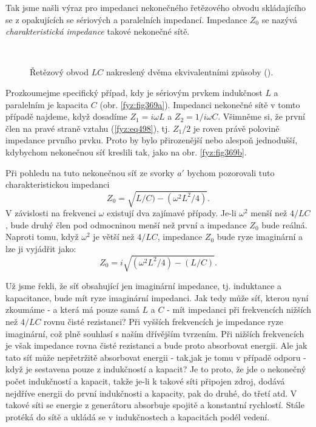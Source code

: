  Tak jsme našli výraz pro impedanci nekonečného řetězového obvodu skládajícího se z opakujících se 
  sériových a paralelních impedancí. Impedance \(Z_0\) se nazývá \emph{charakteristická impedance} 
  takové nekonečné sítě. 
  
  \begin{figure}[ht!] %
    \centering
      \\
    \caption{Řetězový obvod \(LC\) nakreslený dvěma ekvivalentními způsoby
             (\cite[s.~409]{Feynman02}).}
    \label{fyz:fig369}
  \end{figure}
  Prozkoumejme specifický případ, kdy je sériovým prvkem indukčnost \(L\) a paralelním je kapacita 
  \(C\) (obr. \ref{fyz:fig369a}). Impedanci nekonečné sítě v tomto případě najdeme, když dosadíme 
  \(Z_1 =i\omega L\) a \(Z_2 = 1/i\omega C\). Všimněme si, že první člen na pravé straně vztahu 
  (\ref{fyz:eq498}), tj. \(Z_1/2\) je roven právě polovině impedance prvního prvku. Proto by bylo 
  přirozenější nebo alespoň jednodušší, kdybychom nekonečnou síť kreslili tak, jako na obr. 
  \ref{fyz:fig369b}.
  
  Při pohledu na tuto nekonečnou síť ze svorky \(a'\) bychom pozorovali tuto charakteristickou 
  impedanci
  \begin{equation}\label{fyz:eq499}
    Z_0 = \sqrt{L/C) - (\omega^2L^2/4)}.
  \end{equation}
  V závislosti na frekvenci \(\omega\) existují dva zajímavé případy. Je-li \(\omega^2\) menší než 
  \(4/LC\), bude druhý člen pod odmocninou menší než první a impedance \(Z_0\) bude reálná. Naproti 
  tomu, když \(\omega^2\) je větší než \(4/LC\), impedance \(Z_0\) bude ryze imaginární a lze ji 
  vyjádřit jako:
  \begin{equation*}
    Z_0 = i\sqrt{(\omega^2L^2/4) - (L/C)}.
  \end{equation*}
  
  Už jsme řekli, že síť obsahující jen imaginární impedance, tj. induktance a kapacitance, bude mít 
  ryze imaginární impedanci. Jak tedy může síť, kterou nyní zkoumáme - a která má pouze samá \(L\) 
  a \(C\) - mít impedanci při frekvencích nižších než \(4/LC\) rovnu čisté rezistanci? Při vyšších 
  frekvencích je impedance ryze imaginární, což plně souhlasí s naším dřívějším tvrzením. Při 
  nižších frekvencích je však impedance rovna čisté rezistanci a bude proto absorbovat energii. Ale 
  jak tato síť může nepřetržitě absorbovat energii - tak,jak je tomu v případě odporu - když je 
  sestavena pouze z indukčností a kapacit? Je to proto, že jde o nekonečný počet indukčností a 
  kapacit, takže je-li k takové síti připojen zdroj, dodává nejdříve energii do první indukčnosti a 
  kapacity, pak do druhé, do třetí atd. V takové síti se energie z generátoru absorbuje spojitě a 
  konstantní rychlostí. Stále protéká do sítě a ukládá se v indukčnostech a kapacitách podél vedení.
  
